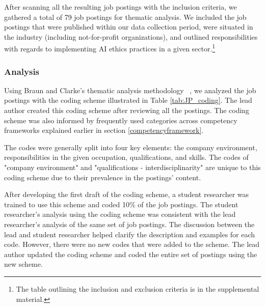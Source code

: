 \documentclass[sigconf]{acmart}
\begin{document}
 After scanning all the resulting job postings with the inclusion criteria, we gathered a total of 79 job postings for thematic analysis. We included the job postings that were published within our data collection period, were situated in the industry (including not-for-profit organizations), and outlined responsibilities with regards to implementing \ac{AI} ethics practices in a given sector.\footnote{The table outlining the inclusion and exclusion criteria is in the supplemental material.}


\subsubsection{Analysis} 

Using Braun and Clarke's thematic analysis methodology ~\cite{Braun2006-rj}, we analyzed the job postings with the coding scheme illustrated in Table \ref{tab:JP_coding}.  The lead author created this coding scheme after reviewing all the postings. The coding scheme was also informed by frequently used categories across competency frameworks explained earlier in section \ref{competencyframework}. 

The codes were generally split into four key elements: the company environment, responsibilities in the given occupation, qualifications, and skills. The codes of "company environment" and "qualifications - interdisciplinarity" are unique to this coding scheme due to their prevalence in the postings' content. 

After developing the first draft of the coding scheme, a student researcher was trained to use this scheme and coded 10\% of the job postings. The student researcher's analysis using the coding scheme was consistent with the lead researcher's analysis of the same set of job postings. The discussion between the lead and student researcher helped clarify the description and examples for each code. However, there were no new codes that were added to the scheme. The lead author updated the coding scheme and coded the entire set of postings using the new scheme. 
\end{document}
